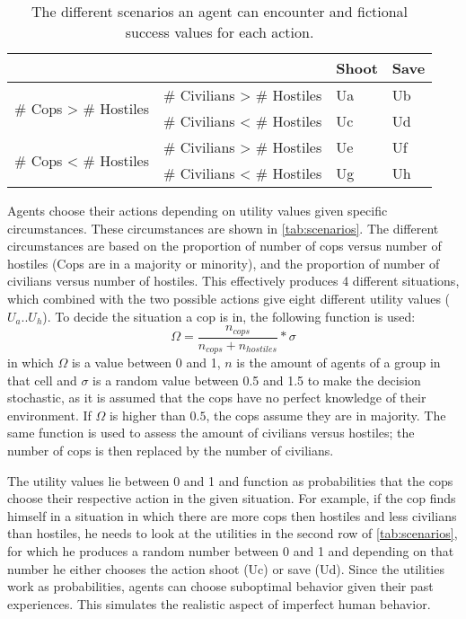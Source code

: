 \begin{table}[H]
	\begin{center}
		\begin{tabular}{l l | l l}
			\hline
			& & Shoot & Save \\
			\hline
			\multirow{2}{*}{\# Cops > \# Hostiles} 
			& {\# Civilians > \# Hostiles} & Ua & Ub \\
			& {\# Civilians < \# Hostiles} & Uc & Ud \\
			\hline
			\multirow{2}{*}{\# Cops < \# Hostiles} 
			& {\# Civilians > \# Hostiles} & Ue & Uf \\
			& {\# Civilians < \# Hostiles} & Ug & Uh \\
			\hline
		\end{tabular}
		\caption{The different scenarios an agent can encounter and fictional success values for each action.
		}
		\label{tab:scenarios}
	\end{center}
\end{table}
\noindent Agents choose their actions depending on utility values given specific circumstances.
These circumstances are shown in \autoref{tab:scenarios}.
The different circumstances are based on the proportion of number of cops versus number of hostiles (Cops are in a majority or minority), 
and the proportion of number of civilians versus number of hostiles. 
This effectively produces 4 different situations, which combined with the two possible actions give eight different utility values ($U_a..U_h$).
To decide the situation a cop is in, the following function is used:
\begin{equation} \label{eq:omega}
\Omega = \frac{n_{cops}}{n_{cops} + n_{hostiles}}*\sigma 
\end{equation}
in which $\Omega$ is a value between 0 and 1, $n$ is the amount of agents of a group in that cell and $\sigma$ is a random value between 0.5 and 1.5 to make the decision stochastic, as it is assumed that the cops have no perfect knowledge of their environment.
If $\Omega$ is higher than $0.5$, the cops assume they are in majority.
The same function is used to assess the amount of civilians versus hostiles; the number of cops is then replaced by the number of civilians.

The utility values lie between 0 and 1 and function as probabilities that the cops choose their respective action in the given situation. For example, if the cop finds himself in a situation in which there are more cops then hostiles and less civilians than hostiles, he needs to look at the utilities in the second row of \autoref{tab:scenarios}, for which he produces a random number between 0 and 1 and depending on that number he either chooses the action shoot (Uc) or save (Ud).
Since the utilities work as probabilities, agents can choose suboptimal behavior given their past experiences. This simulates the realistic aspect of imperfect human behavior. 

